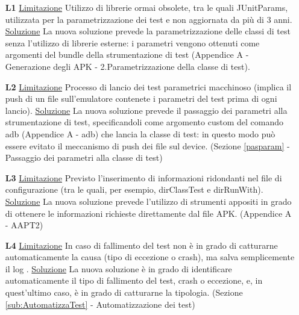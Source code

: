 \begin{itemize}
\item[\textbf{L1} ] 
\ul{Limitazione} Utilizzo di librerie ormai obsolete, tra le quali JUnitParams, utilizzata per la parametrizzazione dei test e non aggiornata da più di 3 anni.
\newline \ul{Soluzione} La nuova soluzione prevede la parametrizzazione delle classi di test senza l'utilizzo di librerie esterne: i parametri vengono ottenuti come argomenti del bundle della strumentazione di test (Appendice A - Generazione degli APK - 2.Parametrizzazione della classe di test). 

\item[\textbf{L2} ] 
\ul{Limitazione} Processo di lancio dei test parametrici macchinoso (implica il push di un file sull'emulatore contenete i parametri del test prima di ogni lancio).
\newline \ul{Soluzione} La nuova soluzione prevede il passaggio dei parametri alla strumentazione di test, specificandoli come argomento custom del comando adb (Appendice A - adb) che lancia la classe di test: in questo modo può essere evitato il meccanismo di push dei file sul device. (Sezione \ref{pasparam} - Passaggio dei parametri alla classe di test) 


\item[\textbf{L3} ] 
\ul{Limitazione} Previsto l'inserimento di informazioni ridondanti nel file di configurazione (tra le quali, per esempio, dirClassTest e dirRunWith). 
\newline \ul{Soluzione} La nuova soluzione prevede l'utilizzo di strumenti appositi in grado di ottenere le informazioni richieste direttamente dal file APK.  (Appendice A - 	AAPT2) 

\item[\textbf{L4} ] 
\ul{Limitazione}  In caso di fallimento del test non è in grado di catturarne automaticamente la causa  (tipo di eccezione o crash), ma salva semplicemente il log .
\newline \ul{Soluzione} La nuova soluzione è in grado di identificare automaticamente il tipo di fallimento del test, crash o eccezione, e, in quest'ultimo caso, è in grado di catturarne la tipologia.  (Sezione \ref{sub:AutomatizzaTest} - Automatizzazione dei test) 
\end{itemize}

